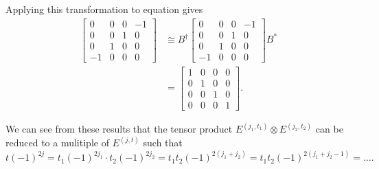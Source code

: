 \documentclass[preprint, 12pt]{revtex4-2}
\numberwithin{equation}{section}
\begin{document}
Applying this transformation to equation gives
\begin{equation}
    \begin{aligned}
        \begin{bmatrix}
            0 & 0 & 0 &-1 \\
            0 & 0 & 1 & 0 \\
            0 & 1 & 0 & 0 \\
           -1 & 0 & 0 & 0
        \end{bmatrix}
        &\cong B^\dagger\begin{bmatrix}
            0 & 0 & 0 &-1 \\
            0 & 0 & 1 & 0 \\
            0 & 1 & 0 & 0 \\
           -1 & 0 & 0 & 0
        \end{bmatrix}B^\ast \\
        &= \begin{bmatrix}
            1 & 0 & 0 & 0 \\
            0 & 1 & 0 & 0 \\
            0 & 0 & 1 & 0 \\
            0 & 0 & 0 & 1
        \end{bmatrix}.
    \end{aligned}
\end{equation}

We can see from these results that the tensor product $E^{(j_1,t_1)}\otimes E^{(j_2,t_2)}$ can be reduced to a mulitiple of $E^{(j,t)}$ such that 
\begin{equation}
    t(-1)^{2j} = t_1(-1)^{2j_1}\cdot t_2(-1)^{2j_2} = t_1t_2(-1)^{2(j_1+j_2)}=t_1t_2(-1)^{2(j_1+j_2-1)}=\hdots.
\end{equation}
\end{document}
